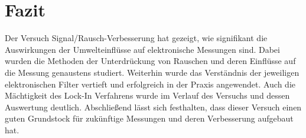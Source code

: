 
\chapter{Fazit}
\label{chap:fazit}

Der Versuch Signal/Rausch-Verbesserung hat gezeigt, wie signifikant die Auswirkungen der Umwelteinflüsse auf elektronische Messungen sind. Dabei wurden die Methoden der Unterdrückung von Rauschen und deren Einflüsse auf die Messung genaustens studiert. Weiterhin wurde das Verständnis der jeweiligen elektronischen Filter vertieft und erfolgreich in der Praxis angewendet. Auch die Mächtigkeit des Lock-In Verfahrens wurde im Verlauf des Versuchs und dessen Auswertung deutlich. Abschließend lässt sich festhalten, dass dieser Versuch einen guten Grundstock für zukünftige Messungen und deren Verbesserung aufgebaut hat.